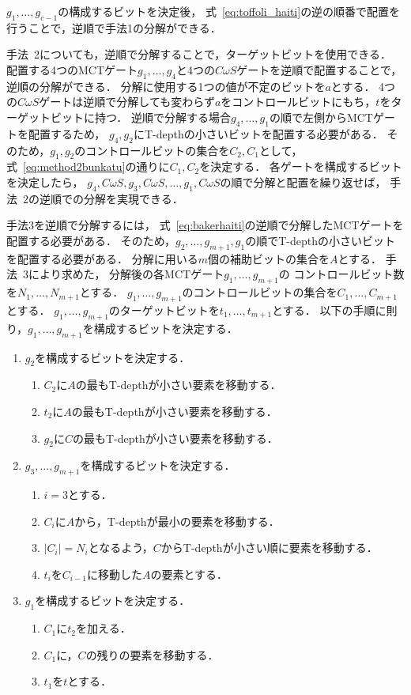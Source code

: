$g_{1},\dots, g_{c-1}$の構成するビットを決定後，
式~\ref{eq:toffoli_haiti}の逆の順番で配置を行うことで，逆順で手法1の分解ができる．
\par
手法~2についても，逆順で分解することで，ターゲットビットを使用できる．
配置する4つのMCTゲート$g_{1},\dots, g_{4}$と4つの$C\omega S$ゲートを逆順で配置することで，逆順の分解ができる．
分解に使用する1つの値が不定のビットを$a$とする．
4つの$C\omega S$ゲートは逆順で分解しても変わらず$a$をコントロールビットにもち，$t$をターゲットビットに持つ．
逆順で分解する場合$g_{4},\dots, g_{1}$の順で左側からMCTゲートを配置するため，
$g_{4}, g_{2}$にT-depthの小さいビットを配置する必要がある．
そのため，$g_{1}, g_{2}$のコントロールビットの集合を$C_{2}, C_{1}$として，
式~\ref{eq:method2bunkatu}の通りに$C_{1}, C_{2}$を決定する．
各ゲートを構成するビットを決定したら，
$g_{4}, C\omega S, g_{3}, C\omega S, \dots , g_{1}, C\omega S$の順で分解と配置を繰り返せば，
手法~2の逆順での分解を実現できる．
\par
手法3を逆順で分解するには，
式~\ref{eq:bakerhaiti}の逆順で分解したMCTゲートを配置する必要がある．
そのため，$g_{2},\dots, g_{m+1}, g_{1}$の順でT-depthの小さいビットを配置する必要がある．
分解に用いる$m$個の補助ビットの集合を$A$とする．
手法~3により求めた，
分解後の各MCTゲート$g_{1},\dots, g_{m+1}$の
コントロールビット数を$N_{1},\dots, N_{m+1}$とする．
$g_{1},\dots,g_{m+1}$のコントロールビットの集合を$C_{1},\dots, C_{m+1}$とする．
$g_{1},\dots,g_{m+1}$のターゲットビットを$t_{1},\dots, t_{m+1}$とする．
以下の手順に則り，$g_{1},\dots ,g_{m+1}$を構成するビットを決定する．
\begin{enumerate}[手順1]
  \item $g_{2}$を構成するビットを決定する．
  \begin{enumerate}
    \item $C_{2}$に$A$の最もT-depthが小さい要素を移動する．
    \item $t_{2}$に$A$の最もT-depthが小さい要素を移動する．
    \item $g_{2}$に$C$の最もT-depthが小さい要素を移動する．
  \end{enumerate}
  \item $g_{3},\dots, g_{m+1}$を構成するビットを決定する．
  \begin{enumerate}
    \item $i=3$とする．
    \item $C_{i}$に$A$から，T-depthが最小の要素を移動する．
    \item $|C_{i}|=N_{i}$となるよう，$C$からT-depthが小さい順に要素を移動する．
    \item $t_{i}$を$C_{i-1}$に移動した$A$の要素とする．
  \end{enumerate}
  \item $g_{1}$を構成するビットを決定する．
  \begin{enumerate}
    \item $C_{1}$に$t_{2}$を加える．
    \item $C_{1}$に，$C$の残りの要素を移動する．
    \item $t_{1}$を$t$とする．
  \end{enumerate}
 \end{enumerate}
